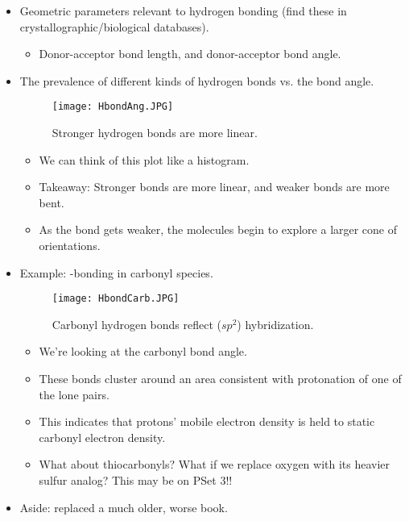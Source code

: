 \documentclass[../notes.tex]{subfiles}
\begin{document}
\begin{itemize}
\begin{itemize}
\begin{itemize}
        \end{itemize}
    \end{itemize}
    \item Geometric parameters relevant to hydrogen bonding (find these in crystallographic/biological databases).
    \begin{itemize}
        \item Donor-acceptor bond length, and donor-acceptor bond angle.
    \end{itemize}
    \item The prevalence of different kinds of hydrogen bonds vs. the bond angle.
    \begin{figure}[H]
        \centering
        \texttt{[image: HbondAng.JPG]}
        \caption{Stronger hydrogen bonds are more linear.}
        \label{fig:HbondAng}
    \end{figure}
    \begin{itemize}
        \item We can think of this plot like a histogram.
        \item Takeaway: Stronger bonds are more linear, and weaker bonds are more bent.
        \item As the bond gets weaker, the molecules begin to explore a larger cone of orientations.
    \end{itemize}
    \item Example: -bonding in carbonyl species.
    \begin{figure}[h!]
        \centering
        \texttt{[image: HbondCarb.JPG]}
        \caption{Carbonyl hydrogen bonds reflect ($sp^2$) hybridization.}
        \label{fig:HbondCarb}
    \end{figure}
    \begin{itemize}
        \item We're looking at the carbonyl  bond angle.
        \item These bonds cluster around an area consistent with protonation of one of the lone pairs.
        \item This indicates that protons' mobile electron density is held to static carbonyl electron density.
        \item What about thiocarbonyls? What if we replace oxygen with its heavier sulfur analog? This may be on PSet 3!!
    \end{itemize}
    \item Aside: \textcite{bib:Anslyn} replaced a much older, worse book.

\end{itemize}
\end{document}
